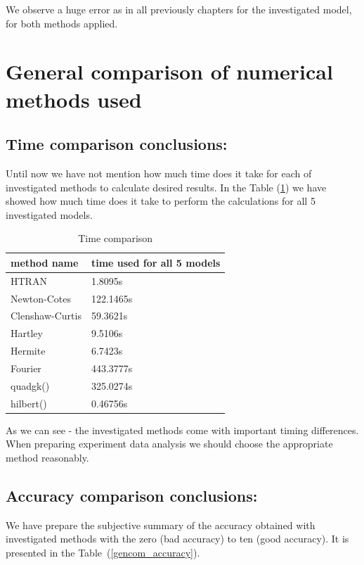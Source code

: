 \documentclass[12pt,twoside,a4paper]{article}
\numberwithin{equation}{subsection}
\numberwithin{figure}{subsection}
\begin{document}
We observe a huge error as in all previously chapters for the investigated model, for both methods applied.

\section{General comparison of numerical methods used} \label{chap:comparison}

\subsection{Time comparison conclusions:} \label{chap:gencom_time}

Until now we have not mention how much time does it take for each of investigated methods to calculate desired results. In the
Table (\ref{gencom_time}) we have showed how much time does it take to perform the calculations for all 5 investigated models.

\begin{table}
  \caption{Time comparison} \label{gencom_time} 
  \begin{tabular}{l l}
    method name  &  time used for all 5 models \\
    \hline
    HTRAN & 1.8095s \\
    Newton-Cotes &  122.1465s \\
    Clenshaw-Curtis & 59.3621s \\
    Hartley & 9.5106s \\
    Hermite & 6.7423s \\
    Fourier & 443.3777s \\
    quadgk() & 325.0274s \\
    hilbert() & 0.46756s \\
    \hline
  \end{tabular}
\end{table} 

As we can see - the investigated methods come with important timing differences. When preparing experiment data analysis we should
choose the appropriate method reasonably.

\subsection{Accuracy comparison conclusions:} \label{chap:gencom_accuracy}

We have prepare the subjective summary of the accuracy obtained with investigated methods with the zero (bad accuracy) to ten
(good accuracy). It is presented in the Table~(\ref{gencom_accuracy}).
\end{document}
